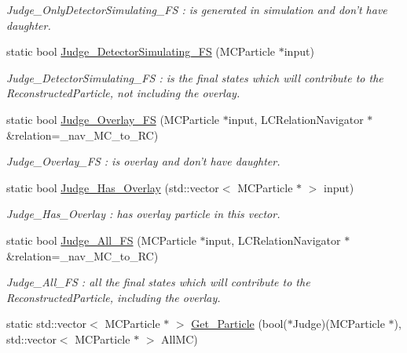 \begin{DoxyCompactItemize}
\begin{DoxyCompactList}\small\item\em Judge\_\-OnlyDetectorSimulating\_\-FS : is generated in simulation and don't have daughter. \item\end{DoxyCompactList}\item 
static bool \hyperlink{classToolSet_1_1CMC_afee9479237283cf64d769fb1b1a361ae}{Judge\_\-DetectorSimulating\_\-FS} (MCParticle $\ast$input)
\begin{DoxyCompactList}\small\item\em Judge\_\-DetectorSimulating\_\-FS : is the final states which will contribute to the ReconstructedParticle, not including the overlay. \item\end{DoxyCompactList}\item 
static bool \hyperlink{classToolSet_1_1CMC_a7230e73142fa3a3a5b2952f11556022c}{Judge\_\-Overlay\_\-FS} (MCParticle $\ast$input, LCRelationNavigator $\ast$\&relation=\_\-nav\_\-MC\_\-to\_\-RC)
\begin{DoxyCompactList}\small\item\em Judge\_\-Overlay\_\-FS : is overlay and don't have daughter. \item\end{DoxyCompactList}\item 
static bool \hyperlink{classToolSet_1_1CMC_a257af2810ec961f3e1a71f29bc12154f}{Judge\_\-Has\_\-Overlay} (std::vector$<$ MCParticle $\ast$ $>$ input)
\begin{DoxyCompactList}\small\item\em Judge\_\-Has\_\-Overlay : has overlay particle in this vector. \item\end{DoxyCompactList}\item 
static bool \hyperlink{classToolSet_1_1CMC_ad5ee7a4ddd73dca280d23d5656ac106d}{Judge\_\-All\_\-FS} (MCParticle $\ast$input, LCRelationNavigator $\ast$\&relation=\_\-nav\_\-MC\_\-to\_\-RC)
\begin{DoxyCompactList}\small\item\em Judge\_\-All\_\-FS : all the final states which will contribute to the ReconstructedParticle, including the overlay. \item\end{DoxyCompactList}\item 
static std::vector$<$ MCParticle $\ast$ $>$ \hyperlink{classToolSet_1_1CMC_ae5e3cc992d63d6efb8030bdb170b87d1}{Get\_\-Particle} (bool($\ast$Judge)(MCParticle $\ast$), std::vector$<$ MCParticle $\ast$ $>$ AllMC)

\end{DoxyCompactItemize}
